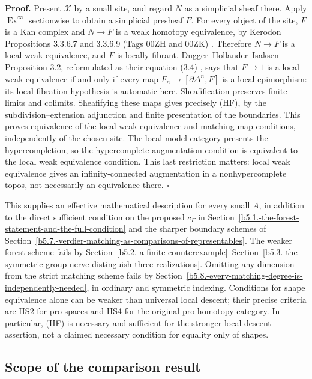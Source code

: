 \documentclass[11pt,a4paper]{article}
\theoremstyle{definition}
\begin{document}
\textbf{Proof.} Present \(\mathcal X\) by a small site, and regard \(N\)
as a simplicial sheaf there. Apply \(\operatorname{Ex}^{\infty}\)
sectionwise to obtain a simplicial presheaf \(F\). For every object of
the site, \(F\) is a Kan complex and \(N\to F\) is a weak homotopy
equivalence, by Kerodon Propositions 3.3.6.7 and 3.3.6.9 (Tags 00ZH and
00ZK) \cite{Kerodon}. Therefore \(N\to F\) is a local weak
equivalence, and \(F\) is locally fibrant. Dugger--Hollander--Isaksen
Proposition 3.2, reformulated as their equation (3.4) \cite{DHI},
says that \(F\to1\) is a local weak equivalence if and only if every map
\(F_n\to[\partial\Delta^n,F]\) is a local epimorphism: its local
fibration hypothesis is automatic here. Sheafification preserves finite
limits and colimits. Sheafifying these maps gives precisely (HF),
by the subdivision--extension adjunction and finite presentation of the
boundaries. This proves equivalence of the local weak equivalence and matching-map conditions, independently of the
chosen site. The local model category presents the hypercompletion, so
the hypercomplete augmentation condition is equivalent to the local weak equivalence condition. This last restriction matters: local weak
equivalence gives an infinity-connected augmentation in a
nonhypercomplete topos, not necessarily an equivalence there.
\(\square\)

This supplies an effective mathematical description for every small
\(A\), in addition to the direct sufficient condition on the
proposed \(c_F\) in Section~\ref{b5.1.-the-forest-statement-and-the-full-condition} and the sharper boundary schemes of Section~\ref{b5.7.-verdier-matching-as-comparisons-of-representables}.
The weaker forest scheme fails by Section~\ref{b5.2.-a-finite-counterexample}--Section~\ref{b5.3.-the-symmetric-group-nerve-distinguish-three-realizations}. Omitting any dimension
from the strict matching scheme fails by Section~\ref{b5.8.-every-matching-degree-is-independently-needed}, in ordinary and symmetric
indexing. Conditions for shape equivalence alone can be weaker than
universal local descent; their precise criteria are HS2 for pro-spaces
and HS4 for the original pro-homotopy category. In particular,
(HF) is necessary and sufficient for the stronger local descent
assertion, not a claimed necessary condition for equality only of shapes.

\subsection{Scope of the comparison
result}\label{scope-of-the-comparison-result}
\end{document}
